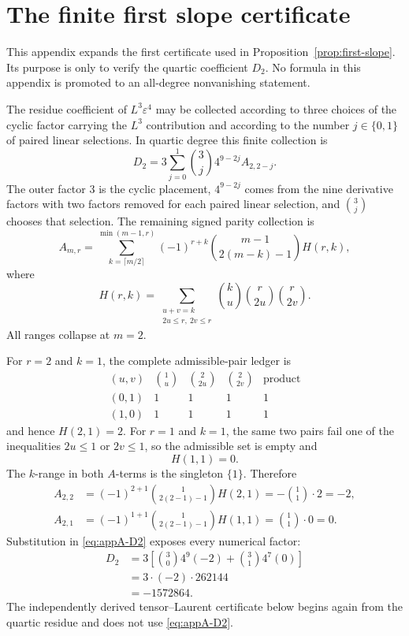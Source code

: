 \documentclass[11pt]{article}
\theoremstyle{definition}
\begin{document}
\clearpage



\clearpage
\appendix

\section{The finite first slope certificate}
\label{app:first-slope}

This appendix expands the first certificate used in Proposition~\ref{prop:first-slope}. Its purpose is only to verify the quartic coefficient $D_2$. No formula in this appendix is promoted to an all-degree nonvanishing statement.

The residue coefficient of $L^3\varepsilon^4$ may be collected according to three choices of the cyclic factor carrying the $L^3$ contribution and according to the number $j\in\{0,1\}$ of paired linear selections. In quartic degree this finite collection is
\begin{equation}
D_2
=3\sum_{j=0}^{1}
\binom{3}{j}4^{9-2j}A_{2,2-j}.
\label{eq:appA-D2}
\end{equation}
The outer factor $3$ is the cyclic placement, $4^{9-2j}$ comes from the nine derivative factors with two factors removed for each paired linear selection, and $\binom3j$ chooses that selection. The remaining signed parity collection is
\[
A_{m,r}
=
\sum_{k=\lceil m/2\rceil}^{\min(m-1,r)}
(-1)^{r+k}
\binom{m-1}{2(m-k)-1}H(r,k),
\]
where
\[
H(r,k)
=
\sum_{\substack{u+v=k\\2u\le r,\ 2v\le r}}
\binom{k}{u}\binom{r}{2u}\binom{r}{2v}.
\]
All ranges collapse at $m=2$.

For $r=2$ and $k=1$, the complete admissible-pair ledger is
\begin{equation}
\begin{array}{c|c|c|c|c}
(u,v)&\binom1u&\binom2{2u}&\binom2{2v}&\text{product}\\ \hline
(0,1)&1&1&1&1\\
(1,0)&1&1&1&1
\end{array}
\label{eq:appA-H21-ledger}
\end{equation}
and hence $H(2,1)=2$. For $r=1$ and $k=1$, the same two pairs fail one of the inequalities $2u\le1$ or $2v\le1$, so the admissible set is empty and
\[
H(1,1)=0.
\]
The $k$-range in both $A$-terms is the singleton $\{1\}$. Therefore
\begin{align*}
A_{2,2}
&=(-1)^{2+1}
\binom{1}{2(2-1)-1}H(2,1)
=-\binom11\cdot2=-2,\\
A_{2,1}
&=(-1)^{1+1}
\binom{1}{2(2-1)-1}H(1,1)
=\binom11\cdot0=0.
\end{align*}
Substitution in \eqref{eq:appA-D2} exposes every numerical factor:
\begin{align*}
D_2
&=3\left[
\binom30 4^9(-2)
+\binom31 4^7(0)
\right]\\
&=3\cdot(-2)\cdot262144\\
&=-1572864.
\end{align*}
The independently derived tensor--Laurent certificate below begins again from the quartic residue and does not use \eqref{eq:appA-D2}.
\end{document}
